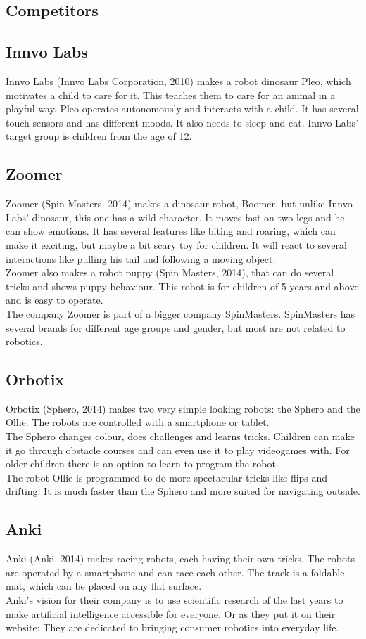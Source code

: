 \documentclass[11pt,twoside,a4paper]{report}
\begin{document}
\begin{appendices}
\chapter{Competitors}
\label{appendix:competitors}
\section{Innvo Labs}
Innvo Labs (Innvo Labs Corporation, 2010) makes a robot dinosaur Pleo, which motivates a child to care for it. This teaches them to care for an animal in a playful way. Pleo operates autonomously and interacts with a child. It has several touch sensors and has different moods. It also needs to sleep and eat. Innvo Labs\rq{} target group is children from the age of 12.
\section{Zoomer}
Zoomer (Spin Masters, 2014) makes a dinosaur robot, Boomer, but unlike Innvo Labs\rq{} dinosaur, this one has a wild character. It moves fast on two legs and he can show emotions. It has several features like biting and roaring, which can make it exciting, but maybe a bit scary toy for children. It will react to several interactions like pulling his tail and following a moving object. \\
Zoomer also makes a robot puppy (Spin Masters, 2014), that can do several tricks and shows puppy behaviour. This robot is for children of 5 years and above and is easy to operate. \\
The company Zoomer is part of a bigger company SpinMasters. SpinMasters has several brands for different age groups and gender, but most are not related to robotics.
\section{Orbotix}
Orbotix (Sphero, 2014) makes two very simple looking robots: the Sphero and the Ollie. The robots are controlled with a smartphone or tablet. \\
The Sphero changes colour, does challenges and learns tricks. Children can make it go through obstacle courses and can even use it to play videogames with. For older children there is an option to learn to program the robot. \\
The robot Ollie is programmed to do more spectacular tricks like flips and drifting. It is much faster than the Sphero and more suited for navigating outside.
\section{Anki}
Anki (Anki, 2014) makes racing robots, each having their own tricks. The robots are operated by a smartphone and can race each other. The track is a foldable mat, which can be placed on any flat surface. \\
Anki\rq{}s vision for their company is to use scientific research of the last years to make artificial intelligence accessible for everyone. Or as they put it on their website: They are dedicated to bringing consumer robotics into everyday life.

\end{appendices}
\end{document}
